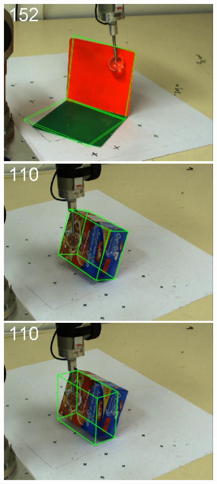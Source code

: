 \begin{figure}[htbp]
{\includegraphics[width=\imgAXwid]{./A1_2exp_876_2}
\includegraphics[width=\imgAXwid]{./A2_2exp_399_2}
\includegraphics[width=\imgAXwid]{./A2_LWPR1_399_2}
}
\end{figure}
